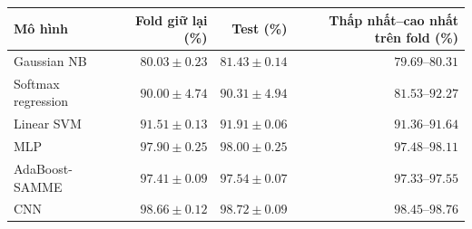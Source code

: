 \begin{tabular}{lrrr}
\toprule
Mô hình & Fold giữ lại (\%) & Test (\%) & Thấp nhất--cao nhất trên fold (\%) \\
\midrule
Gaussian NB & $80.03\pm0.23$ & $81.43\pm0.14$ & $79.69$--$80.31$ \\
Softmax regression & $90.00\pm4.74$ & $90.31\pm4.94$ & $81.53$--$92.27$ \\
Linear SVM & $91.51\pm0.13$ & $91.91\pm0.06$ & $91.36$--$91.64$ \\
MLP & $97.90\pm0.25$ & $98.00\pm0.25$ & $97.48$--$98.11$ \\
AdaBoost-SAMME & $97.41\pm0.09$ & $97.54\pm0.07$ & $97.33$--$97.55$ \\
CNN & \textbf{$98.66\pm0.12$} & $98.72\pm0.09$ & $98.45$--$98.76$ \\
\bottomrule
\end{tabular}
